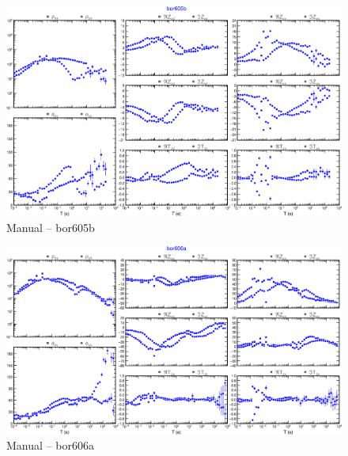     \begin{figure}[H]
        \caption{Manual -- bor605b}
            \begin{center}
                \includegraphics[width=15cm]{texto/figura/sites/M-bor605b.png}
            \end{center}
    \end{figure}
    
    \begin{figure}[H]
        \caption{Manual -- bor606a}
            \begin{center}
                \includegraphics[width=15cm]{texto/figura/sites/M-bor606a.png}
            \end{center}
    \end{figure}
    
